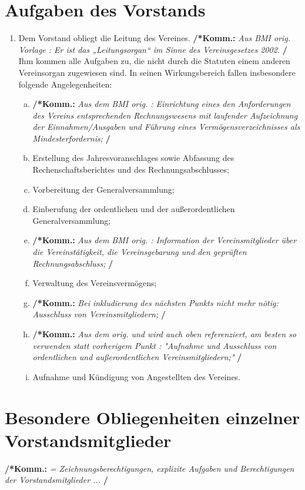 \documentclass[a4paper,12pt]{article}
\newcommand{\comment}[1]{{\bf /*Komm.:} \textit{#1} {\bf */}}
\begin{document}
\section{Aufgaben des Vorstands} %
\begin{enumerate}
\item Dem Vorstand obliegt die Leitung des Vereines. \comment{Aus BMI orig. Vorlage : Er ist das „Leitungsorgan“ im Sinne des Vereinsgesetzes 2002. } Ihm kommen alle Aufgaben zu, die nicht durch die Statuten einem anderen Vereinsorgan zugewiesen sind. In seinen Wirkungsbereich fallen insbesondere folgende Angelegenheiten:
	\begin{enumerate}[(a)]
	\item \comment{Aus dem BMI orig. : Einrichtung eines den Anforderungen des Vereins entsprechenden Rechnungswesens mit laufender Aufzeichnung der Einnahmen/Ausgaben und Führung eines Vermögensverzeichnisses als Mindesterfordernis;} 
	\item Erstellung des Jahresvoranschlages sowie Abfassung des Rechenschaftsberichtes und des Rechnungsabschlusses;
	\item Vorbereitung der Generalversammlung;
	\item Einberufung der ordentlichen und der außerordentlichen Generalversammlung;
	\item \comment{Aus dem BMI orig. : Information der Vereinsmitglieder über die Vereinstätigkeit, die Vereinsgebarung und den geprüften Rechnungsabschluss;}
	\item Verwaltung des Vereinsvermögens;
	\item \comment{Bei inkludierung des nächsten Punkts nicht mehr nötig: Ausschluss von Vereinsmitgliedern;}
	\item \comment{Aus dem orig. und wird auch oben referenziert, am besten so verwenden statt vorherigem Punkt :  "Aufnahme und Ausschluss von ordentlichen und außerordentlichen Vereinsmitgliedern;"}
	\item Aufnahme und Kündigung von Angestellten des Vereines.
	\end{enumerate}
\end{enumerate}

\section{Besondere Obliegenheiten einzelner Vorstandsmitglieder} %
\comment{ = Zeichnungsberechtigungen, explizite Aufgaben und Berechtigungen der Vorstandsmitglieder ... }
\end{document}
